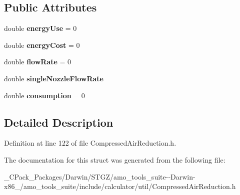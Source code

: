 \subsection*{Public Attributes}
\begin{DoxyCompactItemize}
\item 
\mbox{\label{struct_compressed_air_reduction_1_1_output_ac223071527457cb152e19c7d3d0a9837}} 
double {\bfseries energy\+Use} = 0
\item 
\mbox{\label{struct_compressed_air_reduction_1_1_output_a876379df6466bff2bc52284d0dea0033}} 
double {\bfseries energy\+Cost} = 0
\item 
\mbox{\label{struct_compressed_air_reduction_1_1_output_a641a75e826bb46dd0f13fdde29624e87}} 
double {\bfseries flow\+Rate} = 0
\item 
\mbox{\label{struct_compressed_air_reduction_1_1_output_a5f613bc9d99fa1140491d64364a54d6a}} 
double {\bfseries single\+Nozzle\+Flow\+Rate}
\item 
\mbox{\label{struct_compressed_air_reduction_1_1_output_ae886ab97b0aab6d8ce0e005759fe9275}} 
double {\bfseries consumption} = 0
\end{DoxyCompactItemize}


\subsection{Detailed Description}


Definition at line 122 of file Compressed\+Air\+Reduction.\+h.



The documentation for this struct was generated from the following file\+:\begin{DoxyCompactItemize}
\item 
\+\_\+\+C\+Pack\+\_\+\+Packages/\+Darwin/\+S\+T\+G\+Z/amo\+\_\+tools\+\_\+suite-\/-\/\+Darwin-\/x86\+\_/amo\+\_\+tools\+\_\+suite/include/calculator/util/Compressed\+Air\+Reduction.\+h\end{DoxyCompactItemize}

